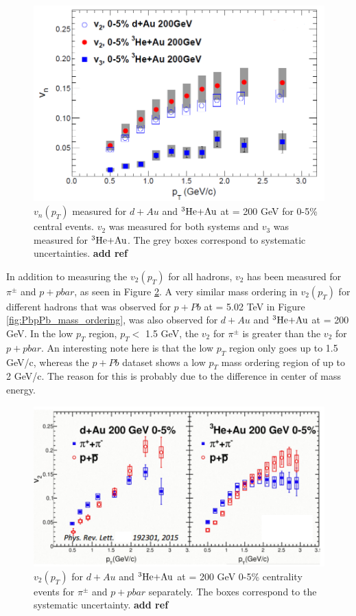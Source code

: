 \begin{figure}[h!]
\begin{center}
\includegraphics[width=0.75\linewidth]{figs/hedau_v2_v3.PNG}
\caption{ $v_n(p_T)$ measured for $d+Au$ and $\mbox{$^3\text{He}$+Au}$ at \sqsn = 200 GeV for 0-5\% central events. $v_2$ was measured for both systems and $v_3$ was measured for $\mbox{$^3\text{He}$+Au}$. The grey boxes correspond to systematic uncertainties. \textbf{add ref}}
\label{fig:dhau_v2_v3}
\end{center}
\end{figure}

In addition to measuring the $v_2(p_T)$ for all hadrons, $v_2$ has been measured for $\pi^{\pm}$ and $p+pbar$, as seen in Figure \ref{fig:dhau_mass_ordering}. A very similar mass ordering in $v_2(p_T)$ for different hadrons that was observed for $p+Pb$ at \sqsn = 5.02 TeV  in Figure \ref{fig:PbpPb_mass_ordering}, was also observed for $d+Au$ and $\mbox{$^3\text{He}$+Au}$ at \sqsn =  200 GeV. In the low $p_T$ region, $ p_T <$ 1.5 GeV, the $v_2$ for $\pi^{\pm}$ is greater than the $v_2$ for $p+pbar$. An interesting note here is that the low $p_T$ region only goes up to 1.5 GeV/c, whereas the $p+Pb$ dataset shows a low $p_T$ mass ordering region of up to 2 GeV/c. The reason for this is probably due to the difference in center of mass energy.

\begin{figure}[h!]
\begin{center}
\includegraphics[width=0.75\linewidth]{figs/dhau_mass_ordering_phenix.PNG}
\caption{ $v_2(p_T)$ for $d+Au$ and $\mbox{$^3\text{He}$+Au}$ at \sqsn = 200 GeV 0-5\% centrality events for $\pi^{\pm}$ and $p+pbar$ separately. The boxes correspond to the systematic uncertainty. \textbf{add ref}}
\label{fig:dhau_mass_ordering}
\end{center}
\end{figure}

